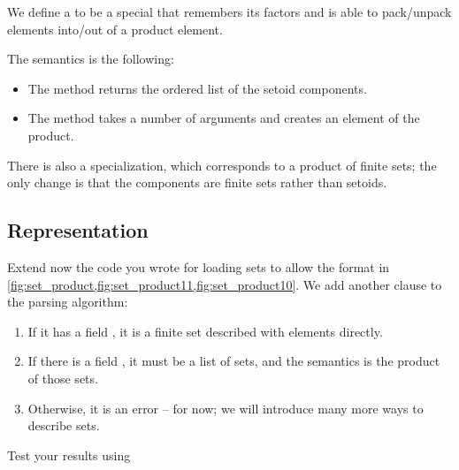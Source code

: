 
We define a  to be a special \Setoid that remembers its factors
and is able to pack/unpack elements into/out of a product element.


The semantics is the following:
\begin{itemize}
    \item The method  returns the ordered list of the setoid components.
    \item The method  takes a number of arguments and creates an element of the product.
\end{itemize}

There is also a specialization, which corresponds to a product of finite sets; the only change is that the components are finite sets rather than setoids.


\clearpage

\subsection{Representation}


%

%

\begin{codeexercise}
    Extend now the code you wrote for loading sets to allow the format in \cref{fig:set_product,fig:set_product11,fig:set_product10}.
    We add another clause to the parsing algorithm:
    \begin{enumerate}
        \item If it has a field , it is a finite set described with elements directly.
        \item If there is a field , it must be a list of sets, and the semantics is the product of those sets.
        \item Otherwise, it is an error -- for now; we will introduce many more ways to describe sets.
    \end{enumerate}
    Test your results using
\end{codeexercise}
